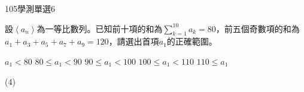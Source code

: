 \begin{QUESTIONS}
\begin{QUESTION}
        \begin{ExamInfo}{105}{學測}{單選}{6}
        \end{ExamInfo}
        \begin{ExamAnsRateInfo}{28}{53}{22}{9}
        \end{ExamAnsRateInfo}
        \begin{QBODY}
			設$\left\langle {{a}_{n}} \right\rangle $為一等比數列。已知前十項的和為$\sum\limits_{k=1}^{10}{{{a}_{k}}}=80$，前五個奇數項的和為${{a}_{1}}+{{a}_{3}}+{{a}_{5}}+{{a}_{7}}+{{a}_{9}}=120$，請選出首項${{a}_{1}}$的正確範圍。
			\begin{QOPS}
				\QOP ${{a}_{1}}<80$
				\QOP $80\le {{a}_{1}}<90$
				\QOP $90\le {{a}_{1}}<100$
				\QOP $100\le {{a}_{1}}<110$
				\QOP $110\le {{a}_{1}}$
			\end{QOPS}
        \end{QBODY}
        \begin{QFROMS}
        \end{QFROMS}
        \begin{QTAGS}\end{QTAGS}
        \begin{QANS}
            (4)
        \end{QANS}
        \begin{QSOLLIST}
        \end{QSOLLIST}
        \begin{QEMPTYSPACE}
        \end{QEMPTYSPACE}
    \end{QUESTION}
\end{QUESTIONS}
